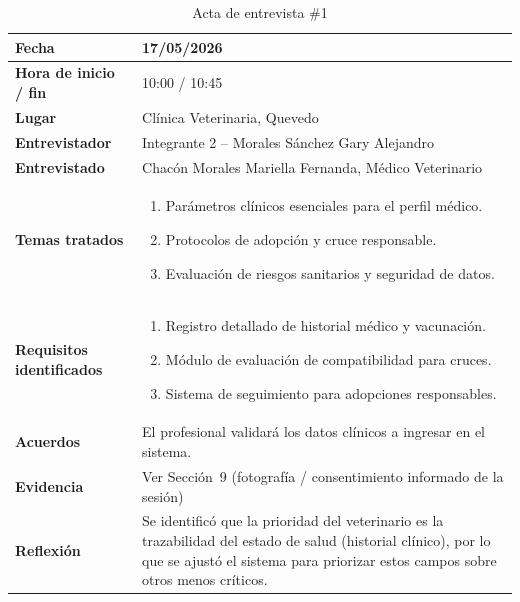 \documentclass[journal,onecolumn]{IEEEtran}
\begin{document}
\begin{table}[H]
\caption{Acta de entrevista \#1}
\label{tab:acta_entrevista}
\begin{tabularx}{\textwidth}{|l|X|}
\hline
\textbf{Fecha}           & 17/05/2026 \\
\hline
\textbf{Hora de inicio / fin}  & 10:00 / 10:45 \\
\hline
\textbf{Lugar}           & Clínica Veterinaria, Quevedo \\
\hline
\textbf{Entrevistador}   & Integrante 2 -- Morales Sánchez Gary Alejandro \\
\hline
\textbf{Entrevistado}    & Chacón Morales Mariella Fernanda, Médico Veterinario \\
\hline
\textbf{Temas tratados}  & \begin{enumerate}[leftmargin=*,topsep=0pt]
                             \item Parámetros clínicos esenciales para el perfil médico.
                             \item Protocolos de adopción y cruce responsable.
                             \item Evaluación de riesgos sanitarios y seguridad de datos.
                           \end{enumerate} \\
\hline
\textbf{Requisitos identificados} & \begin{enumerate}[leftmargin=*,topsep=0pt]
                                      \item Registro detallado de historial médico y vacunación.
                                      \item Módulo de evaluación de compatibilidad para cruces.
                                      \item Sistema de seguimiento para adopciones responsables.
                                    \end{enumerate} \\
\hline
\textbf{Acuerdos}        & El profesional validará los datos clínicos a ingresar en el sistema. \\
\hline
\textbf{Evidencia}       & Ver Sección~9 (fotografía / consentimiento informado de la sesión) \\
\hline
\textbf{Reflexión}       & Se identificó que la prioridad del veterinario es la trazabilidad
                           del estado de salud (historial clínico), por lo que se ajustó el
                           sistema para priorizar estos campos sobre otros menos críticos. \\
\hline
\end{tabularx}
\end{table}
\end{document}
